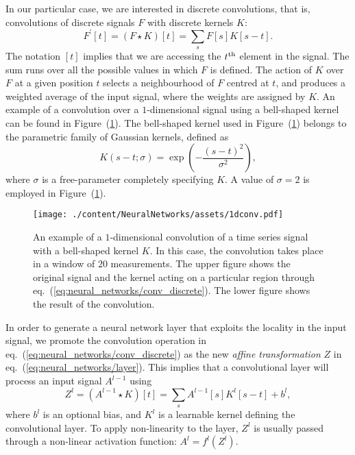 In our particular case, we are interested in discrete convolutions, that is, convolutions of
discrete signals $F$ with discrete kernels $K$:
\begin{equation} 
    F^\prime[t] = (F \star K)[t]  = \sum_s F[s] K[s - t].
    \label{eq:neural_networks/conv_discrete}
\end{equation} 
The notation $[t]$ implies that we are accessing the $t^{\rm th}$ element in the signal. The sum
runs over all the possible values in which $F$ is defined. The action of $K$ over $F$ at a given
position $t$ selects a neighbourhood of $F$ centred at $t$, and produces a weighted average of the
input signal, where the weights are assigned by $K$. An example of a convolution over a
$1$-dimensional signal using a bell-shaped kernel can be found in
Figure~(\ref{fig:neural_networks/conv1d}). The bell-shaped kernel used in
Figure~(\ref{fig:neural_networks/conv1d}) belongs to the parametric family of Gaussian kernels,
defined as
\begin{equation} 
    K(s - t; \sigma) = \exp(- {\frac{{(s - t)}^2}{\sigma^2}}),
    \label{eq:neural_networks/gaussian_kernel}
\end{equation}
where $\sigma$ is a free-parameter completely specifying $K$. A value of $\sigma = 2$ is employed in
Figure~(\ref{fig:neural_networks/conv1d}).

\begin{figure}[t]
    \caption{ 
        An example of a $1$-dimensional convolution of a time series signal with a bell-shaped
        kernel $K$. In this case, the convolution takes place in a window of $20$ measurements. The
        upper figure shows the original signal and the kernel acting on a particular region through
        eq.~(\ref{eq:neural_networks/conv_discrete}). The lower figure shows the result of the
        convolution.
    }\label{fig:neural_networks/conv1d}
    \begin{center}
        \texttt{[image: ./content/NeuralNetworks/assets/1dconv.pdf]}
    \end{center}
\end{figure}

In order to generate a neural network layer that exploits the locality in the input signal, we
promote the convolution operation in eq.~(\ref{eq:neural_networks/conv_discrete}) as the new
\textit{affine transformation} $Z$ in eq.~(\ref{eq:neural_networks/layer}). This implies that a
convolutional layer will process an input signal $A^{l-1}$ using
\begin{equation} 
    Z^{l} = (A^{l-1} \star K)[t]  = \sum_s A^{l-1}[s] K^{l}[s - t] + b^{l},
\end{equation}
where $b^{l}$ is an optional bias, and $K^{l}$ is a learnable kernel defining the convolutional
layer. To apply non-linearity to the layer, $Z^{l}$ is usually passed through a non-linear
activation function: $A^{l} = f^{l}(Z^{l})$.
 
